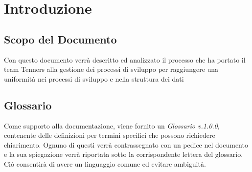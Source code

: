 \section{Introduzione}

\subsection{Scopo del Documento}
Con questo documento verrà descritto ed analizzato il processo che ha portato il team Tenners alla gestione dei processi di sviluppo per raggiungere una uniformità nei processi di sviluppo e nella struttura dei dati

\subsection{Glossario}
Come supporto alla documentazione, viene fornito un \textit{Glossario v.1.0.0}, contenente delle definizioni per termini specifici che possono richiedere chiarimento. Ognuno di questi verrà contrassegnato con un pedice \glo nel documento e la sua spiegazione verrà riportata sotto la corrispondente lettera del glossario. Ciò consentirà di avere un linguaggio comune ed evitare ambiguità.
